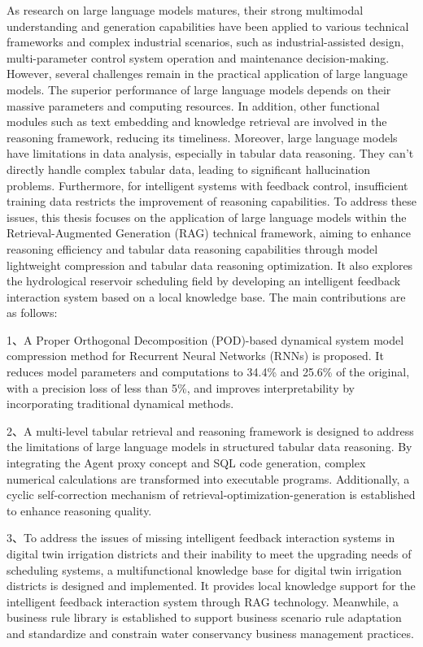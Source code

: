     \begin{eabstract}
        As research on large language models matures, their strong multimodal understanding and generation capabilities have been applied to various technical frameworks and complex industrial scenarios, such as industrial-assisted design, multi-parameter control system operation and maintenance decision-making. However, several challenges remain in the practical application of large language models.
        The superior performance of large language models depends on their massive parameters and computing resources. In addition, other functional modules such as text embedding and knowledge retrieval are involved in the reasoning framework, reducing its timeliness. Moreover, large language models have limitations in data analysis, especially in tabular data reasoning. They can't directly handle complex tabular data, leading to significant hallucination problems. Furthermore, for intelligent systems with feedback control, insufficient training data restricts the improvement of reasoning capabilities.
        To address these issues, this thesis focuses on the application of large language models within the Retrieval-Augmented Generation (RAG) technical framework, aiming to enhance reasoning efficiency and tabular data reasoning capabilities through model lightweight compression and tabular data reasoning optimization. It also explores the hydrological reservoir scheduling field by developing an intelligent feedback interaction system based on a local knowledge base. The main contributions are as follows:
        
        1、A Proper Orthogonal Decomposition (POD)-based dynamical system model compression method for Recurrent Neural Networks (RNNs) is proposed. It reduces model parameters and computations to 34.4\% and 25.6\% of the original, with a precision loss of less than 5\%, and improves interpretability by incorporating traditional dynamical methods.

        2、A multi-level tabular retrieval and reasoning framework is designed to address the limitations of large language models in structured tabular data reasoning. By integrating the Agent proxy concept and SQL code generation, complex numerical calculations are transformed into executable programs. Additionally, a cyclic self-correction mechanism of retrieval-optimization-generation is established to enhance reasoning quality.

        3、To address the issues of missing intelligent feedback interaction systems in digital twin irrigation districts and their inability to meet the upgrading needs of scheduling systems, a multifunctional knowledge base for digital twin irrigation districts is designed and implemented. It provides local knowledge support for the intelligent feedback interaction system through RAG technology. Meanwhile, a business rule library is established to support business scenario rule adaptation and standardize and constrain water conservancy business management practices.


\end{eabstract}
